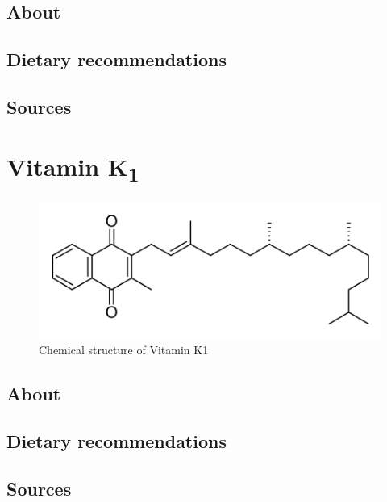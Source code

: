 \documentclass{book}
\begin{document}
\begin{sloppypar}
\section{About}


\section{Dietary recommendations}


\section{Sources}


\chapter{Vitamin K\texorpdfstring{\textsubscript{1}}{1}}
\begin{figure}[h]
	\caption{Chemical structure of Vitamin K1}
	\centering \includegraphics[width=\textwidth]{images/Vitamin_K1_chemical_structure}
\end{figure}
\newpage

\section{About}


\section{Dietary recommendations}


\section{Sources}



\end{sloppypar}
\end{document}
